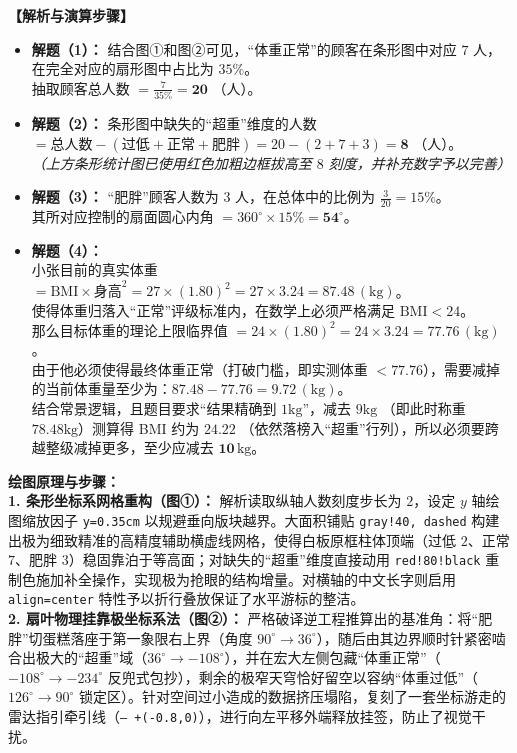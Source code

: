 \vspace{0.4cm}
\textbf{【解析与演算步骤】}
\begin{itemize}
    \item \textbf{解题（1）：} 结合图①和图②可见，“体重正常”的顾客在条形图中对应 $7$ 人，在完全对应的扇形图中占比为 $35\%$。\\
    抽取顾客总人数 $= \frac{7}{35\%} = \mathbf{20}$ （人）。
    \item \textbf{解题（2）：} 条形图中缺失的“超重”维度的人数 $= \text{总人数} - (\text{过低} + \text{正常} + \text{肥胖}) = 20 - (2 + 7 + 3) = \mathbf{8}$ （人）。\\
    \textit{（上方条形统计图已使用红色加粗边框拔高至 $8$ 刻度，并补充数字予以完善）}
    \item \textbf{解题（3）：} “肥胖”顾客人数为 $3$ 人，在总体中的比例为 $\frac{3}{20} = 15\%$。\\
    其所对应控制的扇面圆心内角 $= 360^\circ \times 15\% = \mathbf{54^\circ}$。
    \item \textbf{解题（4）：} \\
    小张目前的真实体重 $= \text{BMI} \times \text{身高}^2 = 27 \times (1.80)^2 = 27 \times 3.24 = 87.48 \, (\mathrm{kg})$。\\
    使得体重归落入“正常”评级标准内，在数学上必须严格满足 $\text{BMI} < 24$。\\
    那么目标体重的理论上限临界值 $= 24 \times (1.80)^2 = 24 \times 3.24 = 77.76 \, (\mathrm{kg})$。\\
    由于他必须使得最终体重正常（打破门槛，即实测体重 $< 77.76$），需要减掉的当前体重量至少为：$87.48 - 77.76 = 9.72 \, (\mathrm{kg})$。\\
    结合常景逻辑，且题目要求“结果精确到 $1\mathrm{kg}$”，减去 $9\mathrm{kg}$ （即此时称重 $78.48\mathrm{kg}$）测算得 BMI 约为 $24.22$ （依然落榜入“超重”行列），所以必须要跨越整级减掉更多，至少应减去 $\mathbf{10 \, \mathrm{kg}}$。
\end{itemize}

\vspace{0.4cm}
{\small\color{blue!70!black}
\textbf{绘图原理与步骤：}\\
\textbf{1. 条形坐标系网格重构（图①）：} 解析读取纵轴人数刻度步长为 $2$，设定 $y$ 轴绘图缩放因子 \texttt{y=0.35cm} 以规避垂向版块越界。大面积铺贴 \texttt{gray!40, dashed} 构建出极为细致精准的高精度辅助横虚线网格，使得白板原框柱体顶端（过低 $2$、正常 $7$、肥胖 $3$）稳固靠泊于等高面；对缺失的“超重”维度直接动用 \texttt{red!80!black} 重制色施加补全操作，实现极为抢眼的结构增量。对横轴的中文长字则启用 \texttt{align=center} 特性予以折行叠放保证了水平游标的整洁。\\
\textbf{2. 扇叶物理挂靠极坐标系法（图②）：} 严格破译逆工程推算出的基准角：将“肥胖”切蛋糕落座于第一象限右上界（角度 $90^\circ \to 36^\circ$），随后由其边界顺时针紧密啮合出极大的“超重”域（$36^\circ \to -108^\circ$），并在宏大左侧包藏“体重正常”（$-108^\circ \to -234^\circ$ 反兜式包抄），剩余的极窄天穹恰好留空以容纳“体重过低”（$126^\circ \to 90^\circ$ 锁定区）。针对空间过小造成的数据挤压塌陷，复刻了一套坐标游走的雷达指引牵引线（\texttt{-- +(-0.8,0)}），进行向左平移外端释放挂签，防止了视觉干扰。
}

